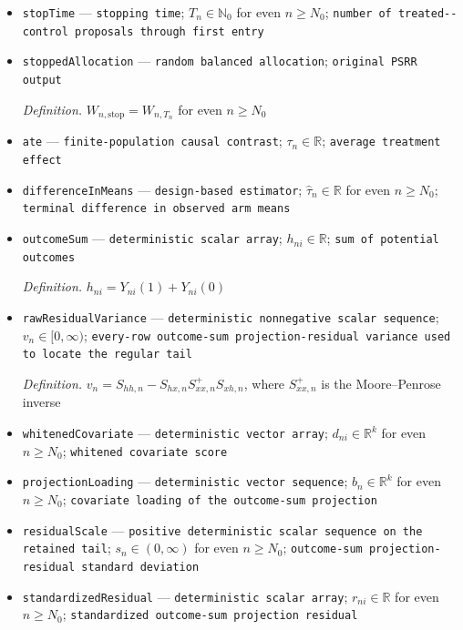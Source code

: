 \documentclass{article}
\begin{document}
\begin{itemize}
  \item \texttt{stopTime} --- \texttt{stopping time}; \(T_n\in\mathbb N_0\) for even \(n\ge N_0\); \texttt{number of treated-\allowbreak{}-\allowbreak{}control proposals through first entry}
  \item \texttt{stoppedAllocation} --- \texttt{random balanced allocation}; \texttt{original PSRR output}
  \par\smallskip\noindent\emph{Definition.} \(W_{n,\mathrm{stop}}=W_{n,T_n}\) for even \(n\ge N_0\)
  \item \texttt{ate} --- \texttt{finite-\allowbreak{}population causal contrast}; \(\tau_n\in\mathbb R\); \texttt{average treatment effect}
  \item \texttt{differenceInMeans} --- \texttt{design-\allowbreak{}based estimator}; \(\widehat\tau_n\in\mathbb R\) for even \(n\ge N_0\); \texttt{terminal difference in observed arm means}
  \item \texttt{outcomeSum} --- \texttt{deterministic scalar array}; \(h_{ni}\in\mathbb R\); \texttt{sum of potential outcomes}
  \par\smallskip\noindent\emph{Definition.} \(h_{ni}=Y_{ni}(1)+Y_{ni}(0)\)
  \item \texttt{rawResidualVariance} --- \texttt{deterministic nonnegative scalar sequence}; \(v_n\in[0,\infty)\); \texttt{every-\allowbreak{}row outcome-\allowbreak{}sum projection-\allowbreak{}residual variance used to locate the regular tail}
  \par\smallskip\noindent\emph{Definition.} \(v_n=S_{hh,n}-S_{hx,n}S_{xx,n}^{+}S_{xh,n}\), where \(S_{xx,n}^{+}\) is the Moore--Penrose inverse
  \item \texttt{whitenedCovariate} --- \texttt{deterministic vector array}; \(d_{ni}\in\mathbb R^k\) for even \(n\ge N_0\); \texttt{whitened covariate score}
  \item \texttt{projectionLoading} --- \texttt{deterministic vector sequence}; \(b_n\in\mathbb R^k\) for even \(n\ge N_0\); \texttt{covariate loading of the outcome-\allowbreak{}sum projection}
  \item \texttt{residualScale} --- \texttt{positive deterministic scalar sequence on the retained tail}; \(s_n\in(0,\infty)\) for even \(n\ge N_0\); \texttt{outcome-\allowbreak{}sum projection-\allowbreak{}residual standard deviation}
  \item \texttt{standardizedResidual} --- \texttt{deterministic scalar array}; \(r_{ni}\in\mathbb R\) for even \(n\ge N_0\); \texttt{standardized outcome-\allowbreak{}sum projection residual}

\end{itemize}
\end{document}
